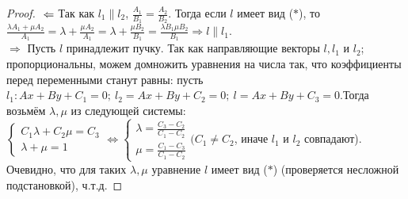 \documentclass[a4paper, 12pt]{article}
\theoremstyle{definition}
\begin{document}
	\begin{proof}
		$\\\Leftarrow$ Так как $l_{1} \parallel l_{2}$, $\frac{A_{1}}{B_{1}} = \frac{A_{2}}{B_{2}}$. Тогда если $l$ имеет вид ($*$), то $\frac{\lambda A_{1}+\mu A_{2}}{A_{1}} = \lambda + \frac{\mu A_{2}}{A_{1}} = \lambda + \frac{\mu B_{2}}{B_{1}} = \frac{\lambda B_{1}\mu B_{2}}{B_{1}} \Rightarrow l \parallel l_{1}$.\\
		$\Rightarrow$ Пусть $l$ принадлежит пучку. Так как направляющие векторы $l, l_{1}$ и $l_{2}$; пропорциональны, можем домножить уравнения на числа так, что коэффициенты перед переменными станут равны: пусть $l_{1}: Ax + By + C_{1} = 0; \ l_{2} = Ax + By + C_{2} = 0; \ l = Ax + By + C_{3} = 0$.Тогда возьмём $\lambda, \mu$ из следующей системы: $\begin{cases}C_{1}\lambda + C_{2}\mu = C_{3}\\\lambda + \mu = 1\end{cases} \Leftrightarrow \begin{cases}\lambda = \frac{C_{3}-C_{2}}{C_{1}-C_{2}}\\\mu = \frac{C_{1} - C_{3}}{C_{1} - C_{2}}\end{cases} (C_{1} \neq C_{2}$, иначе $l_{1}$ и $l_{2}$ совпадают). Очевидно, что для таких $\lambda, \mu$ уравнение $l$ имеет вид ($*$) (проверяется несложной подстановкой), ч.т.д.
	\end{proof}
\end{document}

